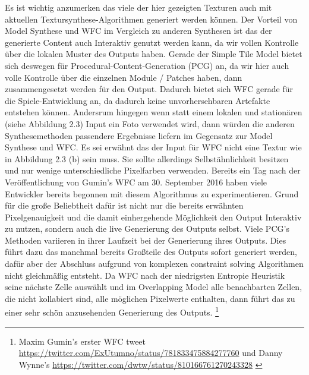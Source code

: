 \documentclass[12pt, a4paper,twoside,openright]{report}
\begin{document}
Es ist wichtig anzumerken das viele der hier gezeigten Texturen auch mit aktuellen Textursynthese-Algorithmen generiert werden können.
Der Vorteil von Model Synthese und WFC im Vergleich zu anderen Synthesen ist das der generierte Content auch Interaktiv genutzt werden kann,
da wir vollen Kontrolle über die lokalen Muster des Outputs haben.
Gerade der Simple Tile Model bietet sich deswegen für Procedural-Content-Generation {(PCG)} an, da wir hier auch volle Kontrolle über die einzelnen Module / Patches haben,
dann zusammengesetzt werden für den Output.
Dadurch bietet sich WFC gerade für die Spiele-Entwicklung an, da dadurch keine unvorhersehbaren Artefakte entstehen können.
Andersrum hingegen wenn statt einem lokalen und stationären {(siehe Abbildung 2.3)} Input ein Foto verwendet wird,
dann würden die anderen Synthesemethoden passendere Ergebnisse liefern im Gegensatz zur Model Synthese und WFC.
Es sei erwähnt das der Input für WFC nicht  eine Textur wie in Abbildung 2.3 {(b)} sein muss.
Sie sollte allerdings Selbstähnlichkeit besitzen und nur wenige unterschiedliche Pixelfarben verwenden.
\newline
Bereits ein Tag nach der Veröffentlichung von Gumin's WFC am 30. September 2016 haben viele Entwickler bereits begonnen mit diesem Algorithmus zu experimentieren.
Grund für die große Beliebtheit dafür ist nicht nur die bereits erwähnten Pixelgenauigkeit und die damit einhergehende Möglichkeit den Output Interaktiv zu nutzen,
sondern auch die live Generierung des Outputs selbst.
Viele PCG's Methoden variieren in ihrer Laufzeit bei der Generierung ihres Outputs.
Dies führt dazu das manchmal bereits Großteile des Outputs sofort generiert werden,
dafür aber der Abschluss aufgrund von komplexen constraint solving Algorithmen nicht gleichmäßig entsteht. \cite{Karth2017WaveFunctionCollapseIC}
Da WFC nach der niedrigsten Entropie Heuristik seine nächste Zelle auswählt und im Overlapping Model alle benachbarten Zellen, die nicht kollabiert sind,
alle möglichen Pixelwerte enthalten, dann führt das zu einer sehr schön anzusehenden Generierung des Outputs.
\footnote[4]{Maxim Gumin’s erster WFC tweet 
\newline
\url{https://twitter.com/ExUtumno/status/781833475884277760}
\newline
und Danny Wynne’s 
\newline
\url{https://twitter.com/dwtw/status/810166761270243328} \cite{Karth2017WaveFunctionCollapseIC}}
\end{document}
